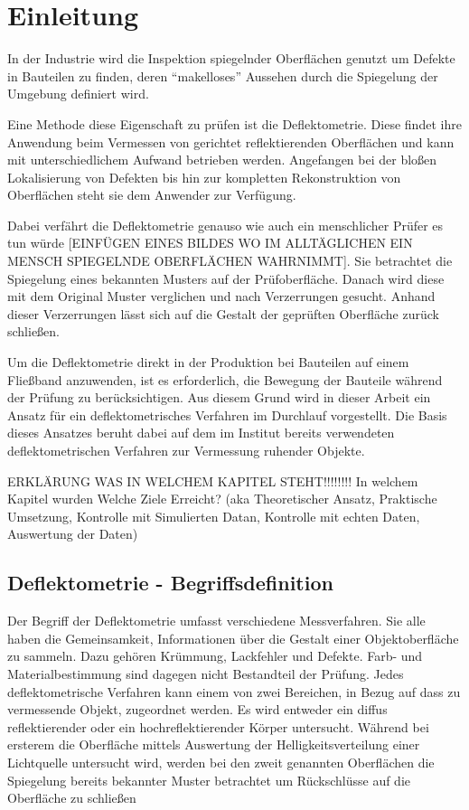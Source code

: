 
\chapter{Einleitung}

In der Industrie wird die Inspektion spiegelnder Oberflächen genutzt um Defekte in Bauteilen zu finden, deren "`makelloses"' Aussehen durch die Spiegelung der Umgebung definiert wird.

Eine Methode diese Eigenschaft zu prüfen ist die Deflektometrie. Diese findet ihre Anwendung beim Vermessen von gerichtet reflektierenden Oberflächen und kann mit unterschiedlichem Aufwand betrieben werden. Angefangen bei der bloßen Lokalisierung von Defekten bis hin zur kompletten Rekonstruktion von Oberflächen steht sie dem Anwender zur Verfügung.

Dabei verfährt die Deflektometrie genauso wie auch ein menschlicher Prüfer es tun würde [EINFÜGEN EINES BILDES WO IM ALLTÄGLICHEN EIN MENSCH SPIEGELNDE OBERFLÄCHEN WAHRNIMMT]. Sie betrachtet die Spiegelung eines bekannten Musters auf der Prüfoberfläche. Danach wird diese mit dem Original Muster verglichen und nach Verzerrungen gesucht. Anhand dieser Verzerrungen lässt sich auf die Gestalt der geprüften Oberfläche zurück schließen.

Um die Deflektometrie direkt in der Produktion bei Bauteilen auf einem Fließband anzuwenden, ist es erforderlich, die Bewegung der Bauteile während der Prüfung zu berücksichtigen. Aus diesem Grund wird in dieser Arbeit ein Ansatz für ein deflektometrisches Verfahren im Durchlauf vorgestellt. Die Basis dieses Ansatzes beruht dabei auf dem im Institut bereits verwendeten deflektometrischen Verfahren zur Vermessung ruhender Objekte.

ERKLÄRUNG WAS IN WELCHEM KAPITEL STEHT!!!!!!!! In welchem Kapitel wurden Welche Ziele Erreicht? (aka Theoretischer Ansatz, Praktische Umsetzung, Kontrolle mit Simulierten Datan, Kontrolle mit echten Daten, Auswertung der Daten)

\section{Deflektometrie - Begriffsdefinition}

Der Begriff der Deflektometrie umfasst verschiedene Messverfahren. Sie alle haben die Gemeinsamkeit, Informationen über die Gestalt einer Objektoberfläche zu sammeln. Dazu gehören Krümmung, Lackfehler und Defekte. Farb- und Materialbestimmung sind dagegen nicht Bestandteil der Prüfung. Jedes deflektometrische Verfahren kann einem von zwei Bereichen, in Bezug auf dass zu vermessende Objekt, zugeordnet werden. Es wird entweder ein diffus reflektierender oder ein hochreflektierender Körper untersucht. Während bei ersterem die Oberfläche mittels Auswertung der Helligkeitsverteilung einer Lichtquelle untersucht wird, werden bei den zweit genannten Oberflächen die Spiegelung bereits bekannter Muster betrachtet um Rückschlüsse auf die Oberfläche zu schließen

